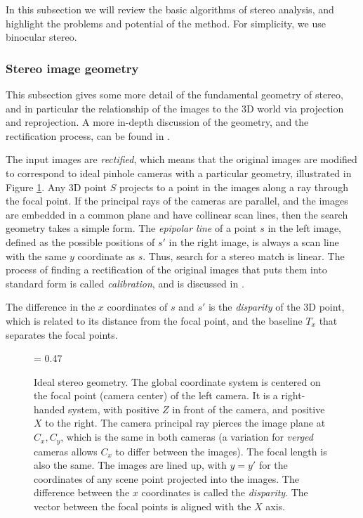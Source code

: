 \documentclass[twocolumn,oneside]{book}
\begin{document}
In this subsection we will review the basic algorithms of stereo
analysis, and highlight the problems and potential of the method.
For simplicity, we use binocular stereo.

\subsubsection{Stereo image geometry}

This subsection gives some more detail of the fundamental geometry of
stereo, and in particular the relationship of the images to the 3D
world via projection and reprojection.  A more in-depth discussion of
the geometry, and the rectification process, can be found in \cite{hartley}.


The input images are {\em rectified}, which means that the original
images are modified to correspond to ideal pinhole cameras with a
particular geometry, illustrated in Figure \ref{fig23.stereo-geometry}.
Any 3D point $S$ projects to a point in the images along a ray through
the focal point.  If the principal rays of the cameras are parallel,
and the images are embedded in a common plane and have collinear scan
lines, then the search geometry takes a simple form.  The {\em
epipolar line} of a point $s$ in the left image, defined as the
possible positions of $s'$ in the right image, is always a scan line
with the same $y$ coordinate as $s$.  Thus, search for a stereo match
is linear.  The process of finding a rectification of the original
images that puts them into standard form is called {\em calibration},
and is discussed in \cite{hartley}.

The difference in the $x$ coordinates of $s$ and $s'$ is the {\em
disparity} of the 3D point, which is related to its distance from the
focal point, and the baseline $T_x$ that separates the focal points.

\begin{figure}

{\epsfxsize = 0.47\textwidth {}}

\caption{
Ideal stereo geometry.  The global coordinate system is centered on
the focal point (camera center) of the left camera.  It is a
right-handed system, with positive $Z$ in front of the camera, and
positive $X$ to the right.  The camera principal ray pierces the image
plane at $C_x,C_y$, which is the same in both cameras (a variation for
{\em verged} cameras allows $C_x$ to differ between the images).  The
focal length is also the same.  The images are lined up, with $y=y'$
for the coordinates of any scene point projected into the images.  The
difference between the $x$ coordinates is called the {\em disparity}.
The vector between the focal points is aligned with the $X$ axis.
\label{fig23.stereo-geometry}}

\end{figure}
\end{document}
